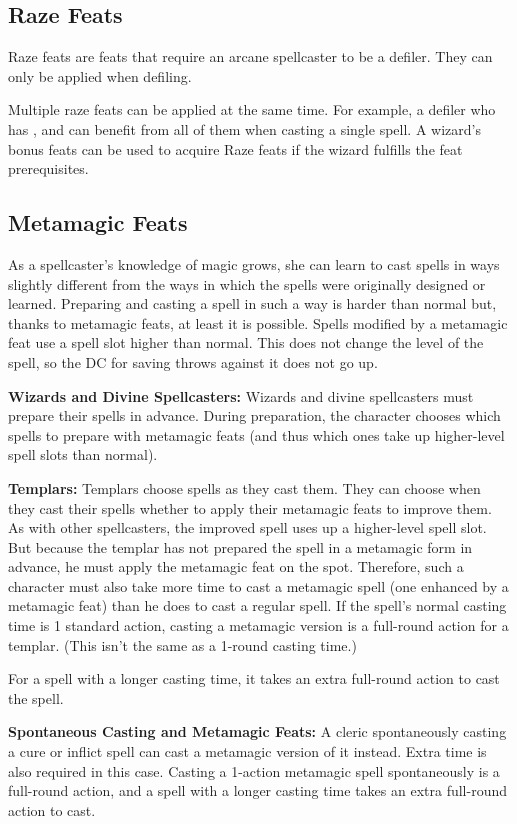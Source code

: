 \subsection{Raze Feats}
Raze feats are feats that require an arcane spellcaster to be a defiler. They can only be applied when defiling.

Multiple raze feats can be applied at the same time. For example, a defiler who has ,  and  can benefit from all of them when casting a single spell. A wizard's bonus feats can be used to acquire Raze feats if the wizard fulfills the feat prerequisites.

\subsection{Metamagic Feats}
As a spellcaster's knowledge of magic grows, she can learn to cast spells in ways slightly different from the ways in which the spells were originally designed or learned. Preparing and casting a spell in such a way is harder than normal but, thanks to metamagic feats, at least it is possible. Spells modified by a metamagic feat use a spell slot higher than normal. This does not change the level of the spell, so the DC for saving throws against it does not go up.

\textbf{Wizards and Divine Spellcasters:} Wizards and divine spellcasters must prepare their spells in advance. During preparation, the character chooses which spells to prepare with metamagic feats (and thus which ones take up higher-level spell slots than normal).

\textbf{Templars:} Templars choose spells as they cast them. They can choose when they cast their spells whether to apply their metamagic feats to improve them. As with other spellcasters, the improved spell uses up a higher-level spell slot. But because the templar has not prepared the spell in a metamagic form in advance, he must apply the metamagic feat on the spot. Therefore, such a character must also take more time to cast a metamagic spell (one enhanced by a metamagic feat) than he does to cast a regular spell. If the spell's normal casting time is 1 standard action, casting a metamagic version is a full-round action for a templar. (This isn't the same as a 1-round casting time.)

For a spell with a longer casting time, it takes an extra full-round action to cast the spell.

\textbf{Spontaneous Casting and Metamagic Feats:} A cleric spontaneously casting a cure or inflict spell can cast a metamagic version of it instead. Extra time is also required in this case. Casting a 1-action metamagic spell spontaneously is a full-round action, and a spell with a longer casting time takes an extra full-round action to cast.

